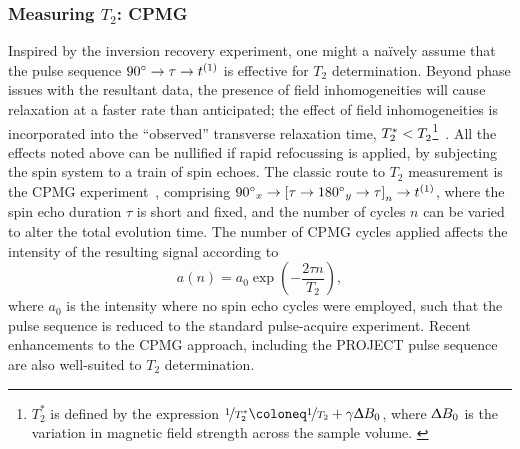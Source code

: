 \subsubsection{Measuring $T_2$: \acs{CPMG}} \label{subsec:cpmg}
Inspired by the inversion recovery experiment, one might a na\"ively assume
that the pulse sequence $\ang{90} \rightarrow \tau \rightarrow t^{(1)}$ is
effective for  $T_2$ determination.
\label{corr:T2-issues}
Beyond phase issues with the resultant data, the
presence of field inhomogeneities will cause relaxation at a faster rate than
anticipated; the effect of field inhomogeneities is incorporated into the
``observed'' transverse relaxation time, $T_2^* < T_2^{\vphantom{*}}$\footnote{
    $T_2^*$ is defined by the expression
    $\nicefrac{1}{T_2^*} \coloneq \nicefrac{1}{T_2} + \gamma \Updelta B_0$,
    where $\Updelta B_0$ is the variation in magnetic field strength across the
    sample volume.
    \label{fn:t2-star}
}~\cite{Chavhan2009}. All the effects noted above can be nullified if rapid
refocussing is applied, by subjecting the spin system to a train of spin
echoes. The classic route to $T_2$ measurement is the \ac{CPMG}
experiment~\cite{Carr1954,Meiboom1958}, comprising $\ang{90}_x \rightarrow
\left[ \tau \rightarrow \ang{180}_y \rightarrow \tau \right]_n \rightarrow
t^{(1)}$, where the spin echo duration $\tau$ is short and fixed, and the number
of cycles $n$ can be varied to alter the total evolution time. The number of
\ac{CPMG} cycles applied affects the intensity of the resulting signal
according to
\begin{equation}
    a(n) = a_0 \exp\left(-\frac{2 \tau n}{T_2}\right),
\end{equation}
where $a_0$ is the intensity where no spin echo cycles were employed, such that
the pulse sequence is reduced to the standard pulse-acquire experiment. Recent
enhancements to the \ac{CPMG} approach, including the \ac{PROJECT} pulse
sequence~\cite{Aguilar2012} are also well-suited to $T_2$ determination.

